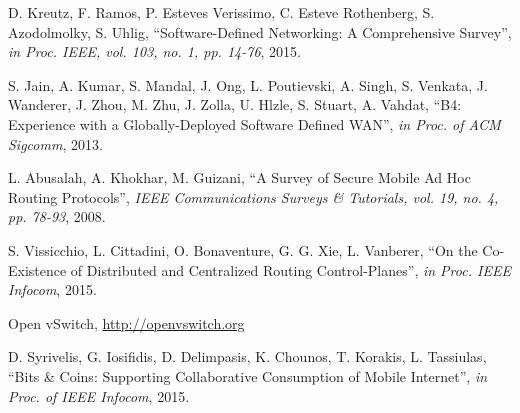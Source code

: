 \documentclass[10pt]{IEEEtran}
\begin{document}
\begin{thebibliography}{99}

 D. Kreutz, F. Ramos, P. Esteves Verissimo, C. Esteve Rothenberg, S. Azodolmolky, S. Uhlig, ``Software-Defined Networking: A Comprehensive Survey'', \emph{in Proc. IEEE, vol. 103, no. 1, pp. 14-76}, 2015.

 S. Jain, A. Kumar, S. Mandal, J. Ong, L. Poutievski, A. Singh, S. Venkata, J. Wanderer, J. Zhou, M. Zhu, J. Zolla, U. Hlzle, S. Stuart, A. Vahdat, ``B4: Experience with a Globally-Deployed Software Defined WAN'', \emph{in Proc. of ACM Sigcomm}, 2013.

 L. Abusalah, A. Khokhar, M. Guizani, ``A Survey of Secure Mobile Ad Hoc Routing Protocols'', \emph{IEEE Communications Surveys \& Tutorials, vol. 19, no. 4, pp. 78-93}, 2008.

 S. Vissicchio, L. Cittadini, O. Bonaventure, G. G. Xie, L. Vanberer, ``On the Co-Existence of Distributed and Centralized Routing Control-Planes'', \emph{in Proc. IEEE Infocom}, 2015.

 Open vSwitch, \url{http://openvswitch.org}


 D. Syrivelis, G. Iosifidis, D. Delimpasis, K. Chounos, T. Korakis, L. Tassiulas, ``Bits \& Coins: Supporting Collaborative Consumption of Mobile Internet'', \emph{in Proc. of IEEE Infocom}, 2015.







\end{thebibliography}
\end{document}
